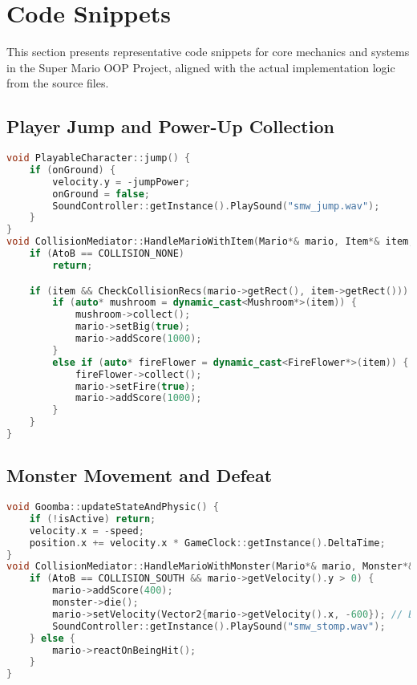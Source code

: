 \clearpage
\section{Code Snippets}

\begin{flushleft}
  This section presents representative code snippets for core mechanics and systems in the Super Mario OOP Project, aligned with the actual implementation logic from the source files.  
\end{flushleft}


\subsection*{Player Jump and Power-Up Collection}
\begin{lstlisting}[language=C++, caption={Mario Jump and Power-Up Collection}]
void PlayableCharacter::jump() {
    if (onGround) {
        velocity.y = -jumpPower;
        onGround = false;
        SoundController::getInstance().PlaySound("smw_jump.wav");
    }
}
void CollisionMediator::HandleMarioWithItem(Mario*& mario, Item*& item, CollisionInfo AtoB) {
    if (AtoB == COLLISION_NONE)
        return;

    if (item && CheckCollisionRecs(mario->getRect(), item->getRect())) {
        if (auto* mushroom = dynamic_cast<Mushroom*>(item)) {
            mushroom->collect();
            mario->setBig(true);
            mario->addScore(1000);
        }
        else if (auto* fireFlower = dynamic_cast<FireFlower*>(item)) {
            fireFlower->collect();
            mario->setFire(true);
            mario->addScore(1000);
        }
    }
}
\end{lstlisting}

\subsection*{Monster Movement and Defeat}
\begin{lstlisting}[language=C++, caption={Goomba Movement and Stomp Defeat}]
void Goomba::updateStateAndPhysic() {
    if (!isActive) return;
    velocity.x = -speed;
    position.x += velocity.x * GameClock::getInstance().DeltaTime;
}
void CollisionMediator::HandleMarioWithMonster(Mario*& mario, Monster*& monster, CollisionInfo AtoB) {
    if (AtoB == COLLISION_SOUTH && mario->getVelocity().y > 0) {
        mario->addScore(400);
        monster->die();
        mario->setVelocity(Vector2{mario->getVelocity().x, -600}); // Bounce
        SoundController::getInstance().PlaySound("smw_stomp.wav");
    } else {
        mario->reactOnBeingHit();
    }
}
\end{lstlisting}

